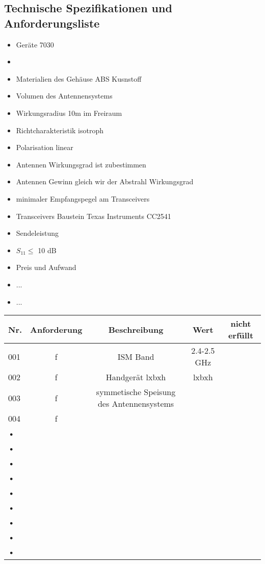 \subsection{Technische Spezifikationen und Anforderungsliste}
\begin{itemize}
\item Geräte 7030
\item 
\item Materialien des Gehäuse ABS Kusnstoff
\item Volumen des Antennensystems
\item Wirkungsradius 10m im Freiraum
\item Richtcharakteristik isotroph
\item Polarisation linear
\item Antennen Wirkungsgrad ist zubestimmen
\item Antennen Gewinn gleich wir der Abstrahl Wirkungsgrad
\item minimaler Empfangspegel am Transceivers
\item Transceivers Baustein Texas Instruments CC2541
\item Sendeleistung
\item $S_{11} \leq$ 10 dB
\item Preis und Aufwand
\item ...
\item ...


\end{itemize}
\begin{tabular}{l|c|c|c|c}
\hline 
Nr. & Anforderung & Beschreibung & Wert & nicht erfüllt \\ 
\hline 
\hline 
001 & f & ISM Band  & 2.4-2.5 GHz & \\ 
\hline 
002 & f & Handgerät lxbxh & lxbxh &   \\ 
\hline 
003 & f & symmetische Speisung des Antennensystems &  \\ 
\hline 
004 & f &  &  \\ 
\hline 
• &  &  &  &  \\ 
\hline 
• &  &  &  &  \\ 
\hline 
• &  &  &  &  \\ 
\hline 
• &  &  &  &  \\
\hline 
• &  &  &  &  \\ 
\hline 
• &  &  &  &  \\ 
\hline 
• &  &  &  &  \\ 
\hline
• &  &  &  &  \\ 
\hline 
• &  &  &  &  \\
\hline 
\end{tabular} 
